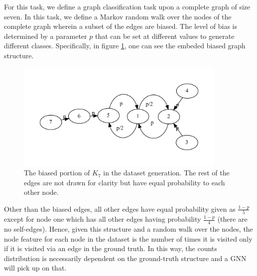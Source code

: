 For this task, we define a graph classification task upon a complete graph of size seven. In this task, we define a Markov random walk over the nodes of the complete graph wherein a subset of the edges are biased. The level of bias is determined by a parameter $p$ that can be set at different values to generate different classes. Specifically, in figure \ref{fig:graph-bias-model}, one can see the embeded biased graph structure.
\begin{figure}[h]
	\centering
	\includegraphics[width=0.9\textwidth]{images/tree-model.pdf}
	\caption{The biased portion of $K_7$ in the dataset generation. The rest of the edges are not drawn for clarity but have equal probability to each other node.}
	\label{fig:graph-bias-model}
\end{figure}
Other than the biased edges, all other edges have equal probability given as $\frac{1 - p}{5}$ except for node one which has all other edges having probability $\frac{1 - p}{4}$ (there are no self-edges). Hence, given this structure and a random walk over the nodes, the node feature for each node in the dataset is the number of times it is visited only if it is visited via an edge in the ground truth. In this way, the counts distribution is necessarily dependent on the ground-truth structure and a GNN will pick up on that.

